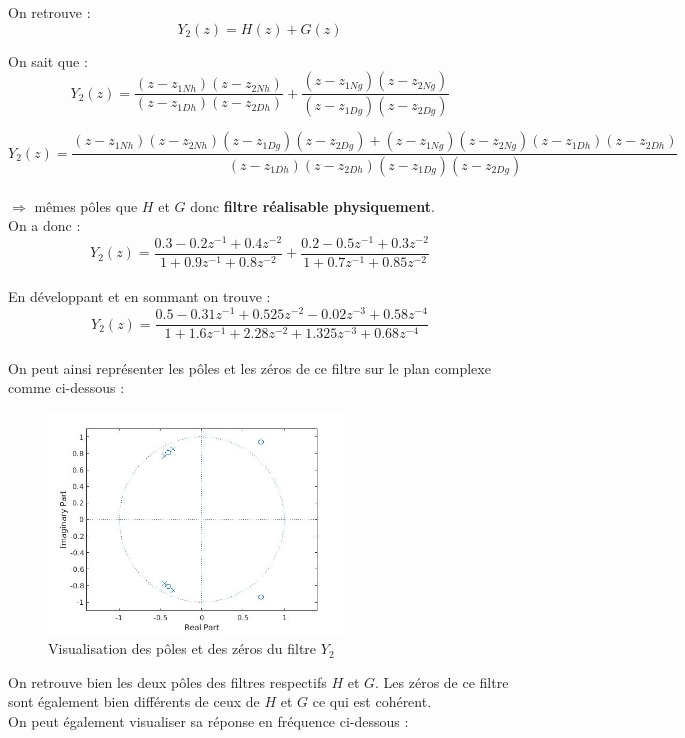 \documentclass[12,french]{report}
\begin{document}
On retrouve :
$$ Y_2(z)=H(z)+G(z)$$

On sait que :
$$ Y_2(z)= \frac{(z-z_{1Nh})(z-z_{2Nh})}{(z-z_{1Dh})(z-z_{2Dh})}+\frac{(z-z_{1Ng})(z-z_{2Ng})}{(z-z_{1Dg})(z-z_{2Dg})} $$

$$ Y_2(z)= \frac{(z-z_{1Nh})(z-z_{2Nh})(z-z_{1Dg})(z-z_{2Dg})+(z-z_{1Ng})(z-z_{2Ng})(z-z_{1Dh})(z-z_{2Dh})}{(z-z_{1Dh})(z-z_{2Dh})(z-z_{1Dg})(z-z_{2Dg})} $$\\
$\Longrightarrow$ mêmes pôles que $H$ et $G$ donc \textbf{filtre réalisable physiquement}.\\


On a donc :\\
$$Y_2(z)=\frac{0.3-0.2z^{-1}+0.4z^{-2}}{1+0.9z^{-1}+0.8z^{-2}}+\frac{0.2-0.5z^{-1}+0.3z^{-2}}{1+0.7z^{-1}+0.85z^{-2}} $$\\

En développant et en sommant on trouve :
$$Y_2(z)=\frac{0.5-0.31z^{-1}+0.525z^{-2}-0.02z^{-3}+0.58z^{-4}}{1+1.6z^{-1}+2.28z^{-2}+1.325z^{-3}+0.68z^{-4}} $$\\

On peut ainsi représenter les pôles et les zéros de ce filtre sur le plan complexe comme ci-dessous :

\begin{figure}[H]
	\center
	\includegraphics[width=0.7\textwidth]{./Images/zplane_Y2}
	\caption{Visualisation des pôles et des zéros du filtre $Y_2$}
\end{figure}\vspace{0.2cm}

On retrouve bien les deux pôles des filtres respectifs $H$ et $G$. Les zéros de ce filtre sont également bien différents de ceux de $H$ et $G$ ce qui est cohérent.\\

On peut également visualiser sa réponse en fréquence ci-dessous :
\end{document}
